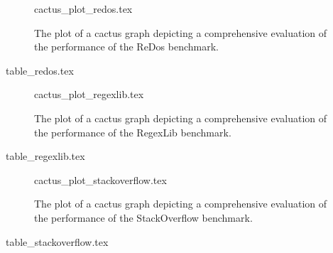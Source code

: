 \documentclass{standalone}
\begin{document}
\begin{figure}
  {cactus_plot_redos.tex}
  \caption{The plot of a cactus graph depicting a comprehensive evaluation of the performance of the ReDos benchmark.}
  \label{fig:cactus_redos}
\end{figure}
\begin{table}
  {table_redos.tex}
  \caption{Detailed results for the ReDos benchmark.}
  \label{tab:results_redos}
\end{table}

\begin{figure}
  {cactus_plot_regexlib.tex}
  \caption{The plot of a cactus graph depicting a comprehensive evaluation of the performance of the RegexLib benchmark.}
  \label{fig:cactus_regexlib}
\end{figure}
\begin{table}
  {table_regexlib.tex}
  \caption{Detailed results for the RegexLib benchmark.}
  \label{tab:results_regexlib}
\end{table}

\begin{figure}
  {cactus_plot_stackoverflow.tex}
  \caption{The plot of a cactus graph depicting a comprehensive evaluation of the performance of the StackOverflow benchmark.}
  \label{fig:cactus_stackoverflow}
\end{figure}
\begin{table}
  {table_stackoverflow.tex}
  \caption{Detailed results for the StackOverflow benchmark.}
  \label{tab:results_stackoverflow}
\end{table}
\end{document}

